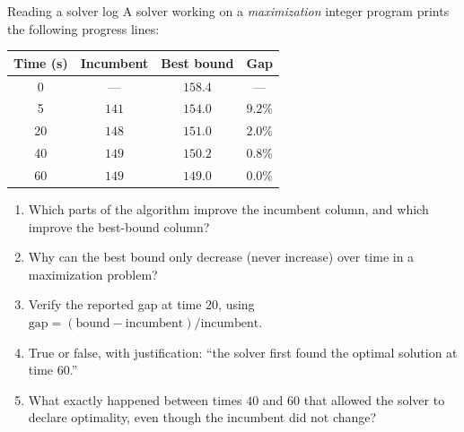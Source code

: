 \begin{ex}{Reading a solver log}{}
\label{ex:ch13-solver-log}
A solver working on a \emph{maximization} integer program prints the
following progress lines:
\begin{center}
\begin{tabular}{cccc}
\toprule
Time (s) & Incumbent & Best bound & Gap\\
\midrule
0  & ---   & $158.4$ & ---\\
5  & $141$ & $154.0$ & $9.2\%$\\
20 & $148$ & $151.0$ & $2.0\%$\\
40 & $149$ & $150.2$ & $0.8\%$\\
60 & $149$ & $149.0$ & $0.0\%$\\
\bottomrule
\end{tabular}
\end{center}
\begin{enumerate}
\item Which parts of the algorithm improve the incumbent column, and which
improve the best-bound column?
\item Why can the best bound only decrease (never increase) over time in a
maximization problem?
\item Verify the reported gap at time $20$, using
$\text{gap} = (\text{bound} - \text{incumbent})/\text{incumbent}$.
\item True or false, with justification: ``the solver first found the optimal
solution at time $60$.''
\item What exactly happened between times $40$ and $60$ that allowed the
solver to declare optimality, even though the incumbent did not change?
\end{enumerate}
\exrefs{\S\ref{sec:solver-output}; \S\ref{sec:branch-and-bound}}
\end{ex}


